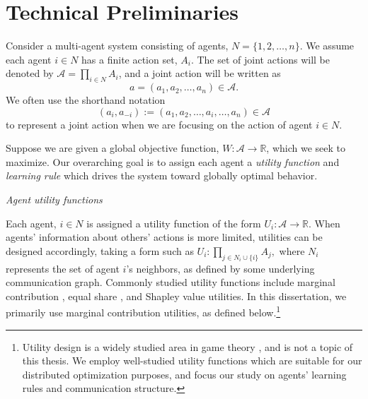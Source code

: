 


\section{Technical Preliminaries}

Consider a multi-agent system consisting of agents, $N = \{1,2,\ldots,n\}$. We assume each agent $i\in N$ has a finite action set, $A_i$. The set of joint actions will be denoted by $\mathcal{A} = \prod_{i\in N} A_i$,  and a joint action will be written as $$a = (a_1,a_2,\ldots,a_n)\in\mathcal{A}.$$ We often use the shorthand notation $$(a_i,a_{-i}) := (a_1,a_2,\ldots,a_i,\ldots,a_n)\in\mathcal{A}$$ to represent a joint action when we are focusing on the action of agent $i\in N.$ 


Suppose we are given a global objective function, $W:\mathcal{A}\to \mathbb{R}$, which we seek to maximize. Our overarching goal is to assign each agent a {\it utility function} and {\it learning rule} which drives the system toward globally optimal behavior.


\noindent\emph{Agent utility functions}

Each agent, $i\in N$ is assigned a utility function of the form $U_i: \mathcal{A}\to\mathbb{R}.$  When agents' information about others' actions is more limited, utilities can be designed accordingly, taking a form such as $U_i:\prod_{j\in N_i\cup \{i\}}A_j,$ where $N_i$ represents the set of agent $i$'s neighbors, as defined by some underlying communication graph. Commonly studied utility functions include marginal contribution \cite{Wolpert1999}, equal share \cite{blah}, and Shapley value \cite{blah} utilities. In this dissertation, we primarily use marginal contribution utilities, as defined below.\footnote{Utility design is a widely studied area in game theory \cite{blah}, and is not a topic of this thesis. We employ well-studied utility functions which are suitable for our distributed optimization purposes, and focus our study on agents' learning rules and communication structure.}

\begin{definition}

\end{definition}


